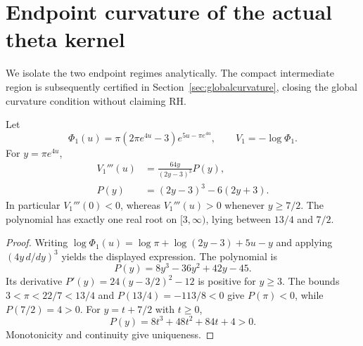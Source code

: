 \section{Endpoint curvature of the actual theta kernel}
\label{sec:curvatureendpoints}
We isolate the two endpoint regimes analytically.
The compact intermediate region is subsequently certified
in Section~\ref{sec:globalcurvature}, closing the global
curvature condition without claiming RH.

\begin{proposition}
Let
\[
\Phi_1(u)=\pi(2\pi e^{4u}-3)e^{5u-\pi e^{4u}},
\qquad V_1=-\log\Phi_1.
\]
For $y=\pi e^{4u}$,
\begin{align}
V_1'''(u)
&=\frac{64y}{(2y-3)^3}P(y),\\
P(y)&=(2y-3)^3-6(2y+3).
\end{align}
In particular $V_1'''(0)<0$, whereas
$V_1'''(u)>0$ whenever $y\ge7/2$.
The polynomial has exactly one real root
on $[3,\infty)$, lying between $13/4$
and $7/2$.
\end{proposition}
\begin{proof}
Writing $\log\Phi_1(u)=
\log\pi+\log(2y-3)+5u-y$
and applying $(4y\,d/dy)^3$ yields
the displayed expression. The polynomial is
\[
P(y)=8y^3-36y^2+42y-45.
\]
Its derivative $P'(y)=24(y-3/2)^2-12$
is positive for $y\ge3$. The bounds
$3<\pi<22/7<13/4$ and $P(13/4)=-113/8<0$
give $P(\pi)<0$, while $P(7/2)=4>0$.
For $y=t+7/2$ with $t\ge0$,
\[
P(y)=8t^3+48t^2+84t+4>0.
\]
Monotonicity and continuity give uniqueness.
\end{proof}

